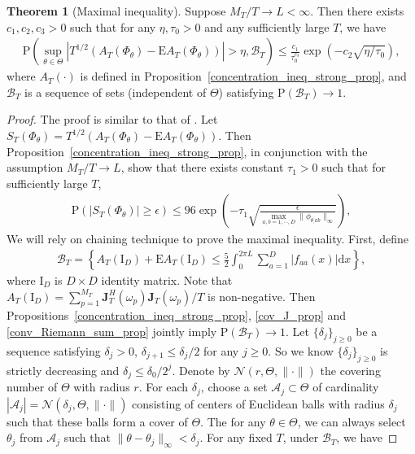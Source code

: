 \documentclass[11pt]{article}
\numberwithin{equation}{section}
\theoremstyle{plain}
\theoremstyle{definition}
\theoremstyle{definition}
\theoremstyle{assumption}
\theoremstyle{proposition}
\theoremstyle{proposition}
\theoremstyle{example}
\theoremstyle{lemma}
\theoremstyle{theorem}
\newtheorem{theorem}{Theorem}[section]
\theoremstyle{remark}
\begin{document}
\begin{theorem}[Maximal inequality]
Suppose $M_T/T \rightarrow L < \infty$. Then there exists $c_1,c_2,c_3>0$ such that for any $\eta,\tau_0>0$ and any sufficiently large $T$, we have
\begin{align*}
\mathrm{P}\left(\sup_{\theta\in\Theta}|T^{1/2}(A_T(\Phi_{\theta}) - \mathrm{E}A_T(\Phi_{\theta}))| > \eta, \mathcal{B}_T\right) \leqslant \frac{c_1}{\tau_0^{c_3}}\exp(-c_2\sqrt{\eta/\tau_0}),
\end{align*}
where $A_T(\cdot)$ is defined in Proposition~\ref{concentration_ineq_strong_prop}, and $\mathcal{B}_T$ is a sequence of sets (independent of $\Theta$) satisfying $\mathrm{P}(\mathcal{B}_T)\rightarrow 1$.
\begin{proof}
The proof is similar to that of \citet[Theorem 2.9]{Dahlhaus_and_Polonik2009}. Let $S_T(\Phi_{\theta}) = T^{1/2}(A_T(\Phi_{\theta}) - \mathrm{E}A_T(\Phi_{\theta}))$. Then Proposition~\ref{concentration_ineq_strong_prop}, in conjunction with the assumption $M_T/T \rightarrow L$, show that there exists constant $\tau_1>0$ such that for sufficiently large $T$,
\begin{align*}
\mathrm{P}\left(|S_T(\Phi_{\theta})| \geqslant \epsilon\right) \leqslant 96\exp\left(-\tau_1\sqrt{\frac{\epsilon}{\max_{a,b=1,\cdots,D}\|\phi_{\theta_,ab}\|_{\infty}}} \right),
\end{align*}
We will rely on chaining technique to prove the maximal inequality. First, define
\begin{align*}
\mathcal{B}_T = \left\{A_T(\boldsymbol{\mathrm{I}}_{D}) + \mathrm{E}A_T(\boldsymbol{\mathrm{I}}_{D}) \leqslant \frac{5}{2}\int_{0}^{2\pi L} \sum_{a=1}^{D}|f_{aa}(x)|\mathrm{d}x\right\},
\end{align*}
where $\boldsymbol{\mathrm{I}}_{D}$ is $D\times D$ identity matrix. Note that $A_T(\boldsymbol{\mathrm{I}}_{D}) = \sum_{p=1}^{M_T} \boldsymbol{J}_T^{H}(\omega_p)\boldsymbol{J}_T(\omega_p)/T$ is non-negative. Then Propositions~\ref{concentration_ineq_strong_prop}, \ref{cov_J_prop} and \ref{conv_Riemann_sum_prop} jointly imply $\mathrm{P}(\mathcal{B}_T)\rightarrow 1$. Let $\{\delta_j\}_{j\geqslant0}$ be a sequence satisfying $\delta_j>0$, $\delta_{j+1} \leqslant \delta_j/2$ for any $j\geqslant0$. So we know $\{\delta_j\}_{j\geqslant0}$ is strictly decreasing and $\delta_j\leqslant \delta_0/2^j$. Denote by $\mathcal{N}(r,\Theta,\|\cdot\|)$ the covering number of $\Theta$ with radius $r$. For each $\delta_j$, choose a set $\mathcal{A}_j\subset\Theta$ of cardinality $|\mathcal{A}_j|=\mathcal{N}(\delta_j,\Theta,\|\cdot\|)$ consisting of centers of Euclidean balls with radius $\delta_j$ such that these balls form a cover of $\Theta$. The for any $\theta\in\Theta$, we can always select $\theta_j$ from $\mathcal{A}_j$ such that $\|\theta-\theta_j\|_{\infty}<\delta_j$. For any fixed $T$, under $\mathcal{B}_T$, we have

\end{proof}
\end{theorem}
\end{document}
